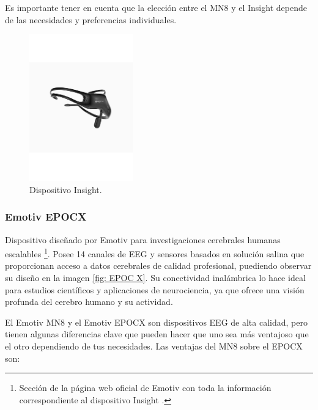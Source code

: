 Es importante tener en cuenta que la elección entre el MN8 y el Insight depende de las necesidades y preferencias individuales.

\begin{figure}[H]
    \centering
    \includegraphics[width=0.4\textwidth]{img/Insight.pdf}
    \caption{Dispositivo Insight.}
    \label{fig: Insight}
\end{figure}

\subsubsection{Emotiv EPOCX}
Dispositivo diseñado por Emotiv para investigaciones cerebrales humanas escalables \cite{EmotivEPOCX}\footnote{Sección de la página web oficial de Emotiv con toda la información correspondiente al dispositivo Insight \cite{EmotivEPOCX}.}. Posee 14 canales de EEG y sensores basados en solución salina que proporcionan acceso a datos cerebrales de calidad profesional, puediendo observar su diseño en la imagen \ref{fig: EPOC X}. Su conectividad inalámbrica lo hace ideal para estudios científicos y aplicaciones de neurociencia, ya que ofrece una visión profunda del cerebro humano y su actividad.

El Emotiv MN8 y el Emotiv EPOCX son dispositivos EEG de alta calidad, pero tienen algunas diferencias clave que pueden hacer que uno sea más ventajoso que el otro dependiendo de tus necesidades. Las ventajas del MN8 sobre el EPOCX son:

